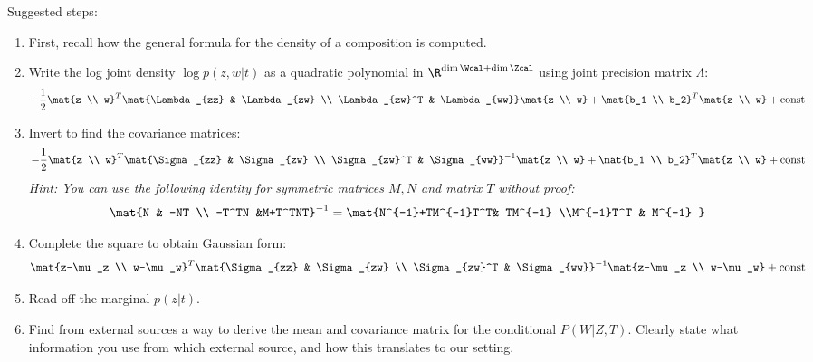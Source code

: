 \begin{enumerate}
  Suggested steps:
  \begin{enumerate}[label=\roman*)]
    \item First, recall how the general formula for the density of a composition is computed.
    \item Write the log joint density $\log p(z, w|t)$ as a quadratic polynomial in $\R^{\dim \Wcal + \dim \Zcal}$ using joint precision matrix $\Lambda$:
    \[
      -\frac{1}{2} \mat{z \\ w}^T  \mat{\Lambda_{zz} & \Lambda_{zw} \\ \Lambda_{zw}^T & \Lambda_{ww}}\mat{z \\ w} + \mat{b_1 \\ b_2}^T\mat{z \\ w} + \text{const}
    \]
    \item Invert to find the covariance matrices:
    \[
      -\frac{1}{2} \mat{z \\ w}^T  \mat{\Sigma_{zz} & \Sigma_{zw} \\ \Sigma_{zw}^T & \Sigma_{ww}}^{-1}\mat{z \\ w} + \mat{b_1 \\ b_2}^T\mat{z \\ w} + \text{const}
    \]
    \emph{Hint: You can use the following identity for symmetric matrices $M,N$ and matrix $T$ without proof:}
    \begin{align*}
      \mat{N & -NT \\ -T^TN  &M+T^TNT}^{-1} = \mat{N^{-1}+TM^{-1}T^T&  TM^{-1}  \\M^{-1}T^T & M^{-1} }
    \end{align*}
    \item Complete the square to obtain Gaussian form:
    \[
      \mat{z-\mu_z \\ w-\mu_w}^T \mat{\Sigma_{zz} & \Sigma_{zw} \\ \Sigma_{zw}^T & \Sigma_{ww}}^{-1}\mat{z-\mu_z \\ w-\mu_w} + \text{const}
    \]

    \item Read off the marginal $p(z|t)$.

    \item Find from external sources a way to derive the mean and covariance matrix for the conditional $P(W|Z, T)$. Clearly state what information you use from which external source, and how this translates to our setting.
  \end{enumerate}


\end{enumerate}
